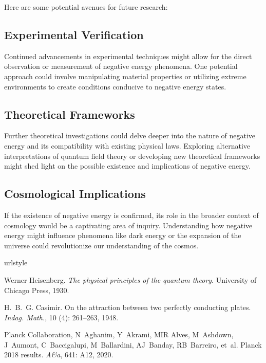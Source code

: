 \documentclass[aip,apl,amsmath,amssymb,reprint]{revtex4-2}
\begin{document}
Here are some potential avenues for future research:
\subsection*{Experimental Verification} 
    Continued advancements in experimental techniques might allow for the direct observation 
    or measurement of negative energy phenomena. 
    One potential approach could involve manipulating material properties or utilizing extreme environments 
    to create conditions conducive to negative energy states.
\subsection*{Theoretical Frameworks} 
    Further theoretical investigations could delve deeper into the nature of negative energy and 
    its compatibility with existing physical laws. 
    Exploring alternative interpretations of quantum field theory or developing new theoretical 
    frameworks might shed light on the possible existence and implications of negative energy.
\subsection*{Cosmological Implications} 
    If the existence of negative energy is confirmed, 
    its role in the broader context of cosmology would be a captivating area of inquiry. 
    Understanding how negative energy might influence phenomena like dark energy or the expansion of 
    the universe could revolutionize our understanding of the cosmos.

\begin{thebibliography}{3}
\providecommand{\natexlab}[1]{#1}
\providecommand{\url}[1]{\texttt{#1}}
\expandafter\ifx\csname urlstyle\endcsname\relax
  \providecommand{\doi}[1]{doi: #1}\else
  \providecommand{\doi}{doi: \begingroup \urlstyle{rm}\Url}\fi

Werner Heisenberg.
\newblock \emph{The physical principles of the quantum theory}.
\newblock University of Chicago Press, 1930.

H.~B.~G. Casimir.
\newblock On the attraction between two perfectly conducting plates.
\newblock \emph{Indag. Math.}, 10 (4): 261--263, 1948.

Planck Collaboration, N~Aghanim, Y~Akrami, MIR Alves, M~Ashdown, J~Aumont,
  C~Baccigalupi, M~Ballardini, AJ~Banday, RB~Barreiro, et~al.
\newblock Planck 2018 results.
\newblock \emph{A\&a}, 641: A12, 2020.

\end{thebibliography}

\nocite{*}

\end{document}
